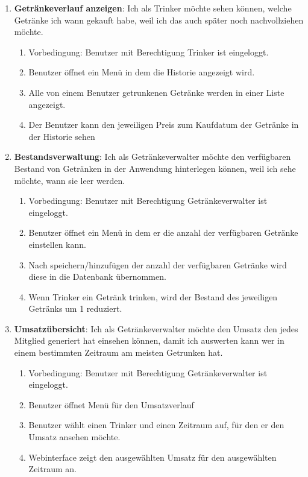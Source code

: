 \documentclass[conference,a4paper]{cs-techrep}
\begin{document}
\begin{enumerate}[{USS}1]

\item \textbf{Getränkeverlauf anzeigen}: Ich als Trinker möchte sehen können, welche Getränke ich wann gekauft habe, weil ich das auch später noch nachvollziehen möchte.
\begin{enumerate}
	\item Vorbedingung: Benutzer mit Berechtigung Trinker ist eingeloggt.
	\item Benutzer öffnet ein Menü in dem die Historie angezeigt wird.
	\item Alle von einem Benutzer getrunkenen Getränke werden in einer Liste angezeigt.
	\item Der Benutzer kann den jeweiligen Preis zum Kaufdatum der Getränke in der Historie sehen
\end{enumerate}

\item \textbf{Bestandsverwaltung}: Ich als Getränkeverwalter möchte den verfügbaren Bestand von Getränken in der Anwendung hinterlegen können, weil ich sehe möchte, wann sie leer werden.
\begin{enumerate}
	\item Vorbedingung: Benutzer mit Berechtigung Getränkeverwalter ist eingeloggt.
	\item Benutzer öffnet ein Menü in dem er die anzahl der verfügbaren Getränke einstellen kann.
	\item Nach speichern/hinzufügen der anzahl der verfügbaren Getränke wird diese in die Datenbank übernommen.
	\item Wenn Trinker ein Getränk trinken, wird der Bestand des jeweiligen Getränks um 1 reduziert.
\end{enumerate}

\item \textbf{Umsatzübersicht}: Ich als Getränkeverwalter möchte den Umsatz den jedes Mitglied generiert hat einsehen können, damit ich auswerten kann wer in einem bestimmten Zeitraum am meisten Getrunken hat.
\begin{enumerate}
	\item Vorbedingung: Benutzer mit Berechtigung Getränkeverwalter ist eingeloggt.
	\item Benutzer öffnet Menü für den Umsatzverlauf
	\item Benutzer wählt einen Trinker und einen Zeitraum auf, für den er den Umsatz ansehen möchte.
	\item Webinterface zeigt den ausgewählten Umsatz für den ausgewählten Zeitraum an.
\end{enumerate}

\end{enumerate}
\end{document}

